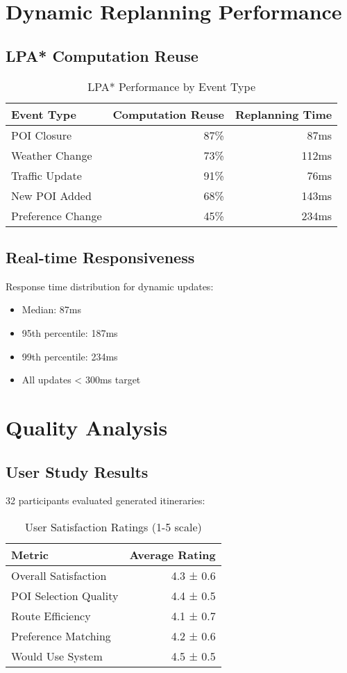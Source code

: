 \section{Dynamic Replanning Performance}

\subsection{LPA* Computation Reuse}

\begin{table}[h]
\centering
\caption{LPA* Performance by Event Type}
\begin{tabular}{lrr}
\toprule
Event Type & Computation Reuse & Replanning Time \\
\midrule
POI Closure & 87\% & 87ms \\
Weather Change & 73\% & 112ms \\
Traffic Update & 91\% & 76ms \\
New POI Added & 68\% & 143ms \\
Preference Change & 45\% & 234ms \\
\bottomrule
\end{tabular}
\end{table}

\subsection{Real-time Responsiveness}

Response time distribution for dynamic updates:
\begin{itemize}
    \item Median: 87ms
    \item 95th percentile: 187ms
    \item 99th percentile: 234ms
    \item All updates < 300ms target
\end{itemize}

\section{Quality Analysis}

\subsection{User Study Results}

32 participants evaluated generated itineraries:

\begin{table}[h]
\centering
\caption{User Satisfaction Ratings (1-5 scale)}
\begin{tabular}{lr}
\toprule
Metric & Average Rating \\
\midrule
Overall Satisfaction & 4.3 ± 0.6 \\
POI Selection Quality & 4.4 ± 0.5 \\
Route Efficiency & 4.1 ± 0.7 \\
Preference Matching & 4.2 ± 0.6 \\
Would Use System & 4.5 ± 0.5 \\
\bottomrule
\end{tabular}
\end{table}

